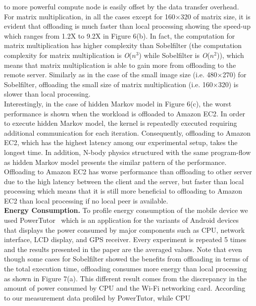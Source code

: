 \documentclass[10pt, conference, compsocconf]{IEEEtran}
\begin{document}
to more powerful compute node is easily offset by the data transfer
overhead.\\
%
\indent For matrix multiplication, in all the cases except for 160$\times$320 of matrix 
size, it is evident that offloading is much faster than local processing 
showing the speed-up which ranges from 1.2X to 9.2X in Figure 6(b).
%
In fact, the computation for matrix multiplication has higher complexity 
than Sobelfilter (the computation complexity for matrix multiplication is
\textit{O}($n^{3}$) 
while Sobelfilter is \textit{O}($n^{2}$)), which means that matrix multiplication is able
to gain more from offloading to the remote server.
%
Similarly as in the case of the small image size (i.e. 480$\times$270) for Sobelfilter, offloading
the small size of matrix multiplication (i.e. 160$\times$320) is slower than local
processing.\\
%
\indent Interestingly, in the case of hidden Markov model in Figure 6(c), 
the worst performance is shown when the workload is offloaded to Amazon EC2. 
%
In order to execute hidden Markov model, the kernel is repeatedly executed 
requiring additional communication for each iteration.
%
Consequently, offloading to Amazon EC2, which has the highest latency 
among our experimental setup, takes the longest time.
%
In addition, N-body physics structured with the same program-flow as hidden
Markov model presents the similar pattern of the performance.
%
Offloading to Amazon EC2 has worse performance than offloading to other 
server due to the high latency between the client and the server, but faster
than local processing which means that it is still more beneficial to
offloading to Amazon EC2 than local processing if no local peer is
available.\\
%
\indent\textbf{Energy Consumption.}
To profile energy consumption of the mobile device we used
PowerTutor~\cite{powertutor} 
which is an application for the variants of Android devices that displays 
the power consumed by major components such as CPU, network interface, LCD
display, and GPS receiver.
%
Every experiment is repeated 5 times and the results presented in the paper
are the averaged values.
%
Note that even though some cases for Sobelfilter showed the benefits from 
offloading in terms of the total execution time, offloading consumes more
energy than local processing as shown in Figure 7(a).
%
This different result comes from the discrepancy in the amount of power 
consumed by CPU and the Wi-Fi networking card.
%
According to our measurement data profiled by PowerTutor, while CPU 
\end{document}
